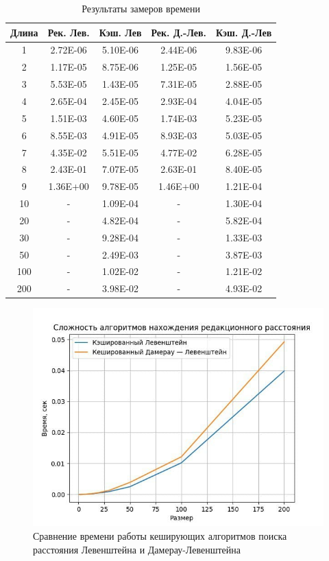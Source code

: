 \begin{table}[H]
	\begin{center}
	    \captionsetup{singlelinecheck = false, justification=centering}
		\caption{Результаты замеров времени}
		\begin{tabular}{c|c|c|c|c}
			Длина & Рек. Лев. & Кэш. Лев & Рек. Д.-Лев. & Кэш. Д.-Лев\\
			\hline
1 & 2.72E-06 & 5.10E-06 & 2.44E-06 & 9.83E-06\\
2 & 1.17E-05 & 8.75E-06 & 1.25E-05 & 1.56E-05\\
3 & 5.53E-05 & 1.43E-05 & 7.31E-05 & 2.88E-05\\
4 & 2.65E-04 & 2.45E-05 & 2.93E-04 & 4.04E-05\\
5 & 1.51E-03 & 4.60E-05 & 1.74E-03 & 5.23E-05\\
6 & 8.55E-03 & 4.91E-05 & 8.93E-03 & 5.03E-05\\
7 & 4.35E-02 & 5.51E-05 & 4.77E-02 & 6.28E-05\\
8 & 2.43E-01 & 7.07E-05 & 2.63E-01 & 8.40E-05\\
9 & 1.36E+00 & 9.78E-05 & 1.46E+00 & 1.21E-04\\
10 & - & 1.09E-04 & - & 1.30E-04\\
20 & - & 4.82E-04 & - & 5.82E-04\\
30 & - & 9.28E-04 & - & 1.33E-03\\
50 & - & 2.49E-03 & - & 3.87E-03\\
100 & - & 1.02E-02 & - & 1.21E-02\\
200 & - & 3.98E-02 & - & 4.93E-02\\
		\end{tabular}
	\end{center}
\end{table}

\begin{figure}[H]
	\centering
	\includegraphics[scale = 0.7]{assets/cacheGraph.jpg}
	\caption{Сравнение времени работы кеширующих алгоритмов поиска расстояния Левенштейна и Дамерау-Левенштейна}
	\label{fig:plot_sorted}
\end{figure}

